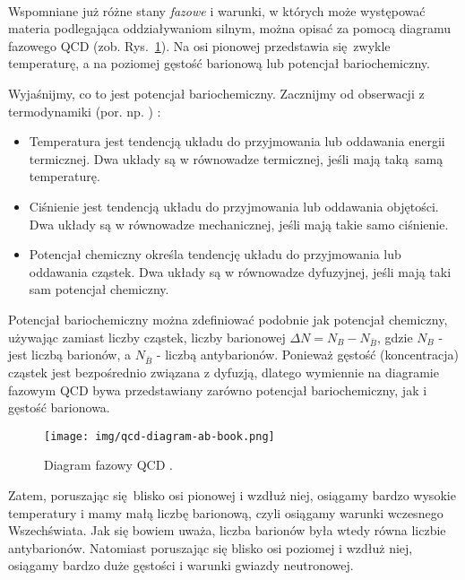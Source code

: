\documentclass[a4paper,12pt]{article}
\begin{document}
\paragraph{}
Wspomniane już różne stany \textit{fazowe} i warunki, w których może występować materia podlegająca oddziaływaniom silnym, można opisać za pomocą diagramu fazowego QCD (zob. Rys.~\ref{fig:qcd-diag-ab}). Na osi pionowej przedstawia się zwykle temperaturę, a na poziomej gęstość barionową lub potencjał bariochemiczny.

Wyjaśnijmy, co to jest potencjał bariochemiczny. Zacznijmy od obserwacji z termodynamiki (por. np. \cite{schroeder}) :
\begin{itemize}
	\item Temperatura jest tendencją układu do przyjmowania lub oddawania energii termicznej. Dwa układy są w równowadze termicznej, jeśli mają taką samą temperaturę.
	\item Ciśnienie jest tendencją układu do przyjmowania lub oddawania objętości. Dwa układy są w równowadze mechanicznej, jeśli mają takie samo ciśnienie.
	\item Potencjał chemiczny określa tendencję układu do przyjmowania lub oddawania cząstek. Dwa układy są w równowadze dyfuzyjnej, jeśli mają taki sam potencjał chemiczny.
\end{itemize}
Potencjał bariochemiczny można zdefiniować podobnie jak potencjał chemiczny, używając zamiast liczby cząstek, liczby barionowej $\Delta N = N_B - N_{\overline{B}}$, gdzie $N_B$ - jest liczbą barionów, a $N_{\overline{B}}$ - liczbą antybarionów. Ponieważ gęstość (koncentracja) cząstek jest bezpośrednio związana z dyfuzją, dlatego wymiennie na diagramie fazowym QCD bywa przedstawiany zarówno potencjał bariochemiczny, jak i gęstość barionowa.

\begin{figure}[H]
	\begin{center}
	\texttt{[image: img/qcd-diagram-ab-book.png]}
	\vspace{-0.1in}
		\caption{Diagram fazowy QCD \cite{Bzdak:2019pkr}. } \label{fig:qcd-diag-ab}
	\end{center}
\end{figure}

Zatem, poruszając się blisko osi pionowej i wzdłuż niej, osiągamy bardzo wysokie temperatury i mamy małą liczbę barionową, czyli osiągamy warunki wczesnego Wszechświata. Jak się bowiem uważa, liczba barionów była wtedy równa liczbie antybarionów. Natomiast poruszając się blisko osi poziomej i wzdłuż niej, osiągamy bardzo duże gęstości i warunki gwiazdy neutronowej.
\end{document}
